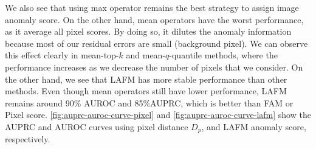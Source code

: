 We also see that using max operator remains the best strategy to assign image anomaly score. On the other hand, mean operators have the worst performance, as it average all pixel scores. By doing so, it dilutes the anomaly information because most of our residual errors are small (background pixel). We can observe this effect clearly in mean-top-$k$ and mean-$q$-quantile methods, where the performance increases as we decrease the number of pixels that we consider. On the other hand, we see that LAFM has more stable performance than other methods. Even though mean operators still have lower performance, LAFM remains around 90\% AUROC and 85\%AUPRC, which is better than FAM or Pixel score. \cref{fig:auprc-auroc-curve-pixel} and \cref{fig:auprc-auroc-curve-lafm} show the AUPRC and AUROC curves using pixel distance $D_p$, and LAFM anomaly score, respectively. 

